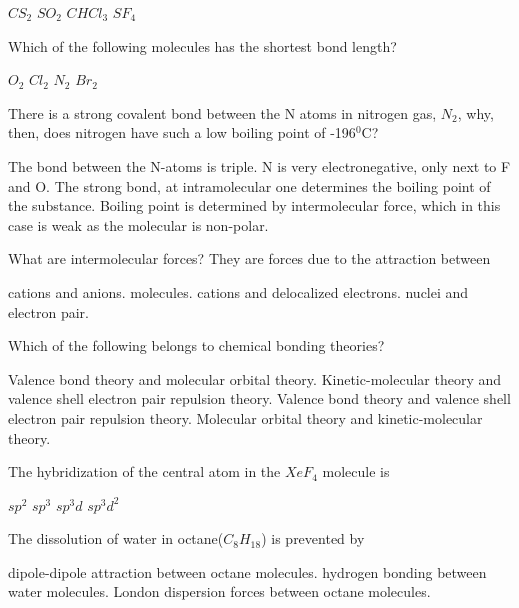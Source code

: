 \documentclass[12pt,addpoints]{exam}
\begin{document}
{{{\begin{questions}
\begin{oneparchoices}
						\choice $CS_2$
						\choice $SO_2$
						\choice $CHCl_3$
						\choice $SF_4$
					\end{oneparchoices}
					\question Which of the following molecules has the shortest bond length? \\
					\begin{oneparchoices}
						\choice $O_2$
						\choice $Cl_2$
						\choice $N_2$
						\choice $Br_2$
					\end{oneparchoices}
					\question There is a strong covalent bond between the N atoms in nitrogen gas, $N_2$, why, then, does nitrogen have such a low boiling point of -196$^0$C?
					\begin{choices}
						\choice The bond between the N-atoms is triple.
						\choice N is very electronegative, only next to F and O.
						\choice The strong bond, at intramolecular one determines the boiling point of the substance.
						\choice Boiling point is determined by intermolecular force, which in this case is weak as the molecular is non-polar.
					\end{choices} 
					\question What are intermolecular forces? They are forces due to the attraction between 
					\begin{choices}
						\choice cations and anions.
						\choice molecules.
						\choice cations and delocalized electrons.
						\choice nuclei and electron pair.
					\end{choices}
					\question Which of the following belongs to chemical bonding theories?
					\begin{choices}
						\choice Valence bond theory and molecular orbital theory.
						\choice Kinetic-molecular theory and valence shell electron pair repulsion theory.
						\choice Valence bond theory and valence shell electron pair repulsion theory.
						\choice Molecular orbital theory and kinetic-molecular theory.
					\end{choices}
					\question The hybridization of the central atom in the $XeF_4$ molecule is \\
				 	\begin{oneparchoices}
				 		\choice $sp^2$
				 		\choice $sp^3$
				 		\choice $sp^3d$
				 		\choice $sp^3d^2$
				 	\end{oneparchoices}
			 		\question The dissolution of water in octane($C_8H_{18}$) is prevented by
			 		\begin{choices}
			 			\choice dipole-dipole attraction between octane molecules.
			 			\choice hydrogen bonding between water molecules.
			 			\choice London dispersion forces between octane molecules.

\end{choices}
\end{questions}}}}
\end{document}
